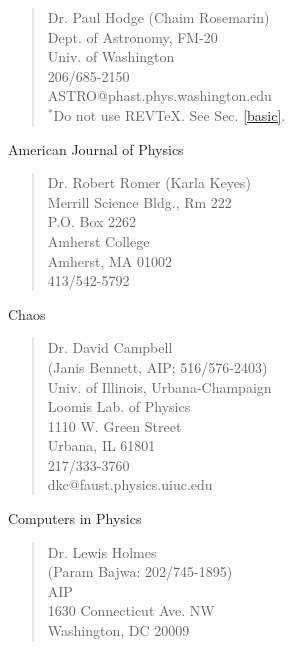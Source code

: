 \begin{verse}
             Dr. Paul Hodge (Chaim Rosemarin)\\
             Dept. of Astronomy, FM-20\\
             Univ. of Washington\\
             206/685-2150\\
             ASTRO@phast.phys.washington.edu\\
             $^*$Do not use REV\TeX .  See Sec. \ref{basic}.
\end{verse}

\noindent      American Journal of Physics

\begin{verse}
             Dr. Robert Romer (Karla Keyes)\\
             Merrill Science Bldg., Rm  222\\
             P.O. Box 2262\\
             Amherst College\\
             Amherst, MA  01002\\
             413/542-5792\\
\end{verse}

\noindent      Chaos

\begin{verse}
             Dr. David Campbell\\
             (Janis Bennett, AIP; 516/576-2403)\\
             Univ. of Illinois, Urbana-Champaign\\
             Loomis Lab. of Physics\\
             1110 W. Green Street\\
             Urbana, IL  61801\\
             217/333-3760\\
             dkc@faust.physics.uiuc.edu\\
\end{verse}

\noindent      Computers in Physics

\begin{verse}
             Dr. Lewis Holmes\\
             (Param Bajwa: 202/745-1895)\\
             AIP\\
             1630 Connecticut Ave. NW\\
             Washington, DC 20009\\
\end{verse}

